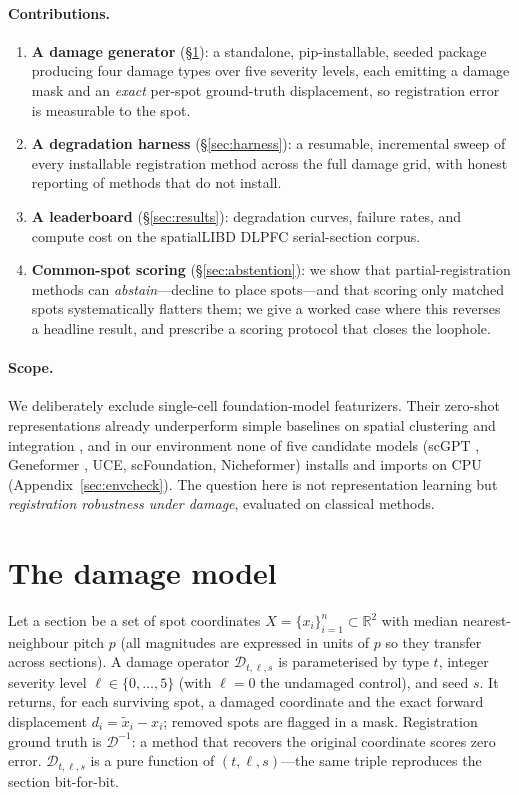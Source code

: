 \documentclass[11pt]{article}
\begin{document}
\paragraph{Contributions.}
\begin{enumerate}
  \item \textbf{A damage generator} (\S\ref{sec:damage}): a standalone,
  pip-installable, seeded package producing four damage types over five severity
  levels, each emitting a damage mask and an \emph{exact} per-spot ground-truth
  displacement, so registration error is measurable to the spot.
  \item \textbf{A degradation harness} (\S\ref{sec:harness}): a resumable,
  incremental sweep of every installable registration method across the full
  damage grid, with honest reporting of methods that do not install.
  \item \textbf{A leaderboard} (\S\ref{sec:results}): degradation curves,
  failure rates, and compute cost on the spatialLIBD DLPFC serial-section corpus.
  \item \textbf{Common-spot scoring} (\S\ref{sec:abstention}): we show that
  partial-registration methods can \emph{abstain}---decline to place spots---and
  that scoring only matched spots systematically flatters them; we give a worked
  case where this reverses a headline result, and prescribe a scoring protocol
  that closes the loophole.
\end{enumerate}

\paragraph{Scope.} We deliberately exclude single-cell foundation-model
featurizers. Their zero-shot representations already underperform simple
baselines on spatial clustering and integration \cite{kedzierska2023assessing},
and in our environment none of five candidate models (scGPT
\cite{cui2024scgpt}, Geneformer \cite{theodoris2023geneformer}, UCE,
scFoundation, Nicheformer) installs and imports on CPU
(Appendix~\ref{sec:envcheck}). The question here is not representation learning
but \emph{registration robustness under damage}, evaluated on classical methods.

\section{The damage model}
\label{sec:damage}
Let a section be a set of spot coordinates $X=\{x_i\}_{i=1}^{n}\subset\mathbb{R}^2$
with median nearest-neighbour pitch $p$ (all magnitudes are expressed in units of
$p$ so they transfer across sections). A damage operator
$\mathcal{D}_{t,\ell,s}$ is parameterised by type $t$, integer severity level
$\ell\in\{0,\dots,5\}$ (with $\ell{=}0$ the undamaged control), and seed $s$. It
returns, for each surviving spot, a damaged coordinate and the exact forward
displacement $d_i = \tilde{x}_i - x_i$; removed spots are flagged in a mask.
Registration ground truth is $\mathcal{D}^{-1}$: a method that recovers the
original coordinate scores zero error. $\mathcal{D}_{t,\ell,s}$ is a pure
function of $(t,\ell,s)$---the same triple reproduces the section bit-for-bit.
\end{document}
